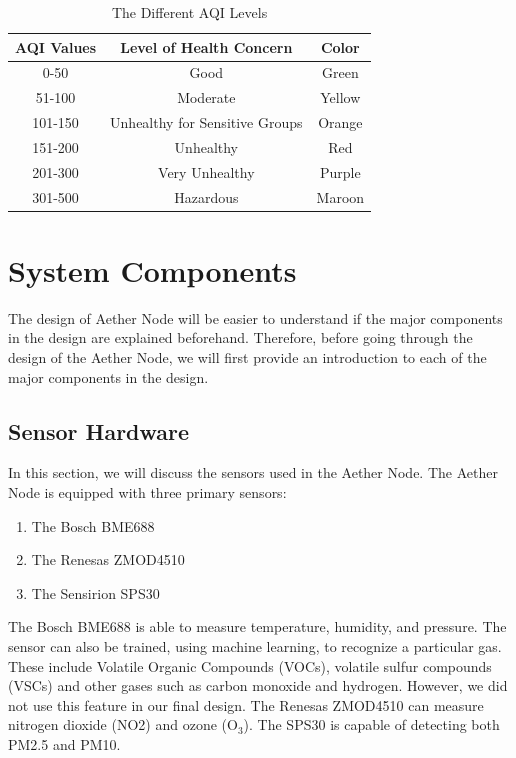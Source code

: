 \documentclass[conference]{IEEEtran}
\begin{document}

\begin{table}
\centering
\caption{The Different AQI Levels \cite{background-aqi}}

\begin{tabular}{|c|c|c|}
\hline
AQI Values & Level of Health Concern & Color \\\hline\hline
0-50 & Good & Green \\\hline
51-100 & Moderate & Yellow \\\hline
101-150 & Unhealthy for Sensitive Groups & Orange \\\hline
151-200 & Unhealthy & Red \\\hline
201-300 & Very Unhealthy & Purple \\\hline
301-500 & Hazardous & Maroon \\\hline
\end{tabular}

\label{tab:aqi-levels}
\end{table}


\section{System Components}
The design of Aether Node will be easier to understand if the major components in the design are explained beforehand. Therefore, before going through the design of the Aether Node, we will first provide an introduction to each of the major components in the design. 

\subsection{Sensor Hardware}
In this section, we will discuss the sensors used in the Aether Node. The Aether Node is equipped with three primary sensors:
\begin{enumerate}
\item The Bosch BME688
\item The Renesas ZMOD4510
\item The Sensirion SPS30
\end{enumerate}
The Bosch BME688 is able to measure temperature, humidity, and pressure. The sensor can also be trained, using machine learning, to recognize a particular gas. These include Volatile Organic Compounds (VOCs), volatile sulfur compounds (VSCs) and other gases such as carbon monoxide and hydrogen. However, we did not use this feature in our final design. The Renesas ZMOD4510 can measure nitrogen dioxide (NO2) and ozone (O$_3$). The SPS30 is capable of detecting both PM2.5 and PM10.
\end{document}
